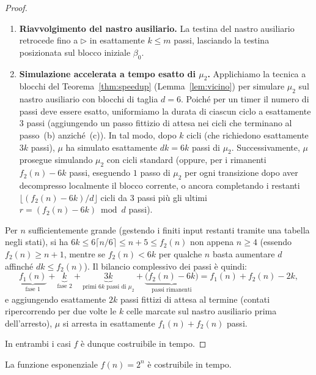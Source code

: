 \begin{proof}
\begin{itemize}
\begin{enumerate}
        \item \textbf{Riavvolgimento del nastro ausiliario.} La testina del nastro ausiliario retrocede fino a $\triangleright$ in esattamente $k \le m$ passi, lasciando la testina posizionata sul blocco iniziale $\beta_0$.

        \item \textbf{Simulazione accelerata a tempo esatto di $\mu_2$.} Applichiamo la tecnica a blocchi del Teorema~\ref{thm:speedup} (Lemma~\ref{lem:vicino}) per simulare $\mu_2$ sul nastro ausiliario con blocchi di taglia $d = 6$. Poich\'e per un timer il numero di passi deve essere esatto, uniformiamo la durata di ciascun ciclo a esattamente $3$ passi (aggiungendo un passo fittizio di attesa nei cicli che terminano al passo~(b) anzich\'e~(c)). In tal modo, dopo $k$ cicli (che richiedono esattamente $3k$ passi), $\mu$ ha simulato esattamente $dk = 6k$ passi di $\mu_2$. Successivamente, $\mu$ prosegue simulando $\mu_2$ con cicli standard (oppure, per i rimanenti $f_2(n) - 6k$ passi, eseguendo $1$ passo di $\mu_2$ per ogni transizione dopo aver decompresso localmente il blocco corrente, o ancora completando i restanti $\lfloor (f_2(n)-6k)/d \rfloor$ cicli da $3$ passi pi\`u gli ultimi $r = (f_2(n)-6k) \bmod d$ passi).
    \end{enumerate}
    Per $n$ sufficientemente grande (gestendo i finiti input restanti tramite una tabella negli stati), si ha $6k \le 6\lceil n/6 \rceil \le n+5 \le f_2(n)$ non appena $n \ge 4$ (essendo $f_2(n) \ge n+1$, mentre se $f_2(n) < 6k$ per qualche $n$ basta aumentare $d$ affinch\'e $dk \le f_2(n)$). Il bilancio complessivo dei passi \`e quindi:
    \[
        \underbrace{f_1(n)}_{\text{fase 1}} + \underbrace{k}_{\text{fase 2}} + \underbrace{3k}_{\text{primi } 6k \text{ passi di } \mu_2} + \underbrace{\bigl(f_2(n) - 6k\bigr)}_{\text{passi rimanenti}} = f_1(n) + f_2(n) - 2k,
    \]
    e aggiungendo esattamente $2k$ passi fittizi di attesa al termine (contati ripercorrendo per due volte le $k$ celle marcate sul nastro ausiliario prima dell'arresto), $\mu$ si arresta in esattamente $f_1(n) + f_2(n)$ passi.
\end{itemize}
In entrambi i casi $f$ \`e dunque costruibile in tempo.
\end{proof}

\begin{lemm}
La funzione esponenziale $f(n)=2^n$ è costruibile in tempo.
\end{lemm}

